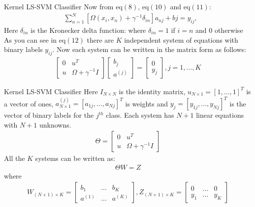 \documentclass{beamer}
\begin{document}
    \begin{frame}{Kernel LS-SVM Classifier}
    Now from eq$(8)$, eq$(10)$ and eq$(11)$:
    \begin{align}
        &\sum_{n=1}^{N} [\Omega(x_{i},x_{n}) + \gamma^{-1}\delta_{in}]a_{nj} + b{j} = y_{ij},
    \end{align}
    Here $\delta_{in}$ is the Kronecker delta function: where $\delta_{in} =1$ if $i=n$ and $0$ otherwise \\
    As you can see in eq$(12)$ there are $K$ independent system of equations with binary labels $y_{ij}$.
    Now each system can be written in the matrix form as follows:
    \begin{align}
        \begin{bmatrix}
            0 & u^{T}                 \\
            u & \Omega + \gamma^{-1}I
        \end{bmatrix}
        \begin{bmatrix}
            b_{j} \\
            a^{(j)}
        \end{bmatrix}
        =
        \begin{bmatrix}
            0 \\
            y_{j}
        \end{bmatrix}
        , j = 1,\ldots,K
    \end{align}
\end{frame}
\begin{frame}{Kernel LS-SVM Classifier}
    Here $I_{N \times N}$ is the identity matrix, $u_{N \times 1} = [1,\ldots,1]^{T}$ is a vector of ones,
    $a^{(j)}_{N \times 1} = [a_{1j}, \ldots, a_{Nj}]^{T}$ is weights and $y_{j} = [y_{1j}, \ldots, y_{Nj}]^{T}$ is the
    vector of binary labels for the $j^{th}$ class.
    Each system has $N+1$ linear equations with $N+1$ unknowns.
    \begin{align}
        \Theta = \begin{bmatrix}
                     0 & u^{T}                 \\
                     u & \Omega + \gamma^{-1}I
        \end{bmatrix}
    \end{align}
    All the $K$ systems can be written as:
    \begin{align}
        \Theta W = Z
    \end{align}
    where
    \begin{align*}
        W_{(N+1) \times K} = \begin{bmatrix}
                                 b_{1}   & \ldots & b_{K}   \\
                                 a^{(1)} & \ldots & a^{(K)}
        \end{bmatrix}
        , Z_{(N+1) \times K} = \begin{bmatrix}
                                   0     & \ldots & 0     \\
                                   y_{1} & \ldots & y_{K}
        \end{bmatrix}
    \end{align*}
\end{frame}
\end{document}
